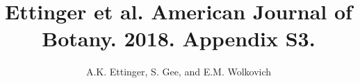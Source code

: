 \documentclass{article}
\begin{document}

\title{Ettinger et al. American Journal of Botany. 2018. Appendix S3.} 
\author{A.K. Ettinger, S. Gee, and E.M. Wolkovich}
\maketitle  %
\renewcommand{\thetable}{S\arabic{table}}
\setcounter{table}{2}





%
\end{document}
